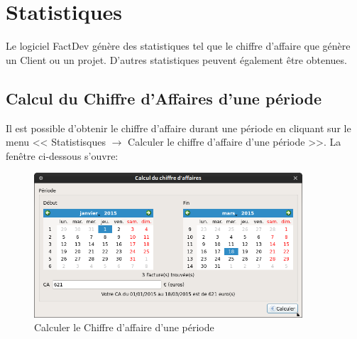 \chapter{Statistiques}
Le logiciel FactDev génère des statistiques tel que le chiffre d'affaire que génère un Client ou un projet. D'autres statistiques peuvent également être obtenues. 
\section{Calcul du Chiffre d'Affaires d'une période}
Il est possible d'obtenir le chiffre d'affaire durant une période en cliquant sur le menu << Statistisques $\rightarrow$ Calculer le chiffre d'affaire d'une période >>. La fenêtre ci-dessous s'ouvre:
\begin{figure}[H]
	\centering
	\includegraphics[width=10cm]{screens/calculCAperiode.png}
	\caption{Calculer le Chiffre d'affaire d'une période}
	\label{fig:calculerCAperiode}
\end{figure}


